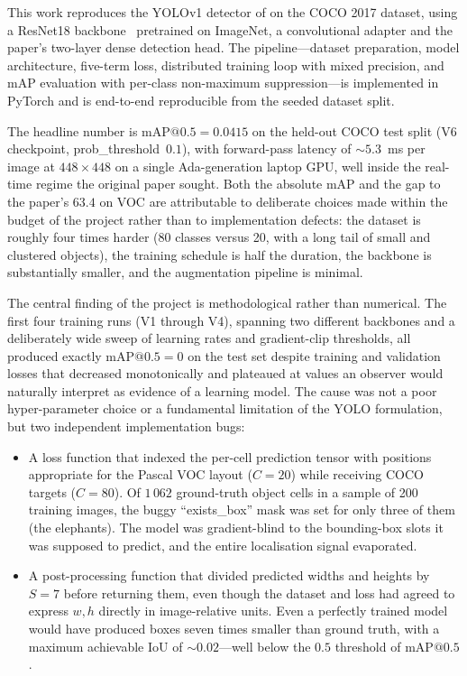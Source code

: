 
This work reproduces the YOLOv1 detector of \citet{redmon2016you} on the COCO
2017 dataset, using a ResNet18 backbone~\citep{he2016deep} pretrained on
ImageNet, a convolutional adapter and the paper's two-layer dense detection
head. The pipeline---dataset preparation, model architecture, five-term
loss, distributed training loop with mixed precision, and mAP evaluation
with per-class non-maximum suppression---is implemented in PyTorch and is
end-to-end reproducible from the seeded dataset split.

The headline number is $\mathrm{mAP}@0.5 = 0.0415$ on the held-out COCO test
split (V6 checkpoint, prob\_threshold~$0.1$), with forward-pass latency of
$\sim\!5.3$~ms per image at $448\!\times\!448$ on a single Ada-generation
laptop GPU, well inside the real-time regime the original paper sought.
Both the absolute mAP and the gap to the paper's $63.4$ on VOC are
attributable to deliberate choices made within the budget of the project
rather than to implementation defects: the dataset is roughly four times
harder (80 classes versus 20, with a long tail of small and clustered
objects), the training schedule is half the duration, the backbone is
substantially smaller, and the augmentation pipeline is minimal.

The central finding of the project is methodological rather than numerical.
The first four training runs (V1 through V4), spanning two different
backbones and a deliberately wide sweep of learning rates and gradient-clip
thresholds, all produced exactly $\mathrm{mAP}@0.5 = 0$ on the test set
despite training and validation losses that decreased monotonically and
plateaued at values an observer would naturally interpret as evidence of a
learning model. The cause was not a poor hyper-parameter choice or a
fundamental limitation of the YOLO formulation, but two independent
implementation bugs:

\begin{itemize}
    \item A loss function that indexed the per-cell prediction tensor with
        positions appropriate for the Pascal VOC layout ($C=20$) while
        receiving COCO targets ($C=80$). Of $1\,062$ ground-truth object
        cells in a sample of 200 training images, the buggy
        ``exists\_box'' mask was set for only three of them (the elephants).
        The model was gradient-blind to the bounding-box slots it was
        supposed to predict, and the entire localisation signal evaporated.
    \item A post-processing function that divided predicted widths and
        heights by $S=7$ before returning them, even though the dataset and
        loss had agreed to express $w, h$ directly in image-relative units.
        Even a perfectly trained model would have produced boxes seven times
        smaller than ground truth, with a maximum achievable IoU of
        $\sim\!0.02$---well below the $0.5$ threshold of $\mathrm{mAP}@0.5$.
\end{itemize}

